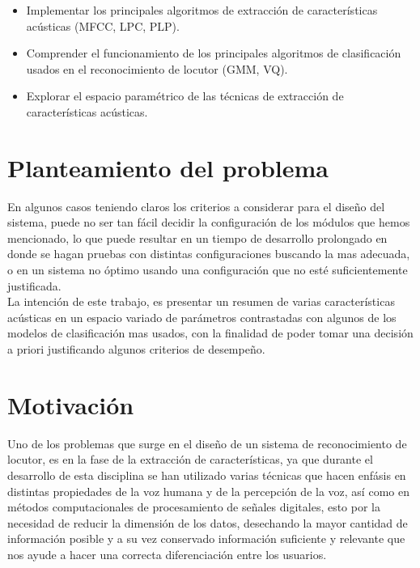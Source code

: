 \begin{itemize}
\item
Implementar los principales algoritmos de extracci\'on de caracter\'isticas ac\'usticas  (MFCC, LPC, PLP).
\item
Comprender el funcionamiento de los principales algoritmos de clasificaci\'on usados en el reconocimiento de locutor (GMM, VQ).
\item
Explorar el espacio param\'etrico de las t\'ecnicas de extracci\'on de caracter\'isticas ac\'usticas.
\end{itemize}
\medskip


\section{Planteamiento del problema} \label{sect:problema}

En algunos casos teniendo claros los criterios a considerar para el diseño del sistema, puede no ser tan f\'acil decidir la configuraci\'on de los m\'odulos que hemos mencionado, lo que puede resultar en un tiempo de desarrollo prolongado en donde se hagan pruebas con distintas configuraciones buscando la mas adecuada, o en un sistema no \'optimo usando una configuraci\'on que no est\'e suficientemente justificada.\\

La intención de este trabajo, es presentar un resumen de varias caracterí­sticas acústicas en un espacio variado de parámetros contrastadas con algunos de los modelos de clasificación mas usados, con la finalidad de poder tomar una decisión a priori justificando algunos criterios de desempeño. 
\medskip


\section{Motivación} \label{sect:motivacion}

Uno de los problemas que surge en el diseño de un sistema de reconocimiento de locutor, es en la fase de la extracci\'on de caracter\'isticas, ya que durante el desarrollo de esta disciplina se han utilizado varias t\'ecnicas que hacen enf\'asis en distintas propiedades de la voz humana y de la percepci\'on de la voz, as\'i como en m\'etodos computacionales de procesamiento de señales digitales, esto por la necesidad de reducir la dimensi\'on de los datos, desechando la mayor cantidad de informaci\'on posible y a su vez conservado informaci\'on suficiente y relevante que nos ayude a hacer una correcta diferenciaci\'on entre los usuarios.\\

